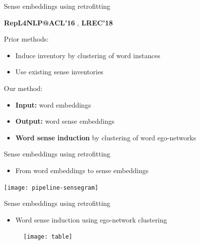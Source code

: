 \begin{frame}{Sense embeddings using retrofitting}
	
	 {\footnotesize \textbf{RepL4NLP@ACL'16} \cite{pelevina-EtAl:2016:RepL4NLP}, \textbf{LREC'18} \cite{remus:2018}}
	
	\begin{block}{Prior methods:}
		\vspace{0.25cm}

	\begin{itemize}	
	\item Induce inventory by \alert{clustering of word instances} %
	\item Use \alert{existing} sense inventories %
	\end{itemize}
\end{block}


	\begin{block}{Our method:}
		\vspace{0.25cm}

	\begin{itemize}	
	\item \textbf{Input:} word embeddings
	\item \textbf{Output:} word sense embeddings
	\item \textbf{Word sense induction} by \alert{clustering of word ego-networks}

	\end{itemize}
\end{block}


\end{frame}

\begin{frame}{Sense embeddings using retrofitting}
\begin{itemize}
\item From word embeddings to sense embeddings
\end{itemize}
\texttt{[image: pipeline-sensegram]}

\end{frame}



\begin{frame}{Sense embeddings using retrofitting}

\begin{itemize}
\item Word sense induction using  ego-network clustering
\end{itemize} 
	
\centering
\begin{figure}
\texttt{[image: table]}
\end{figure}

\end{frame}


